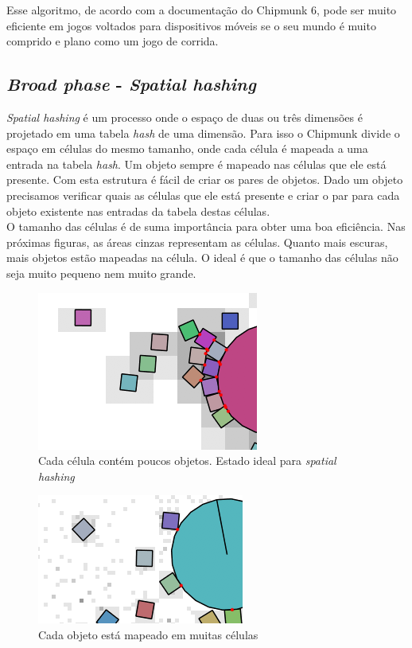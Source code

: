 Esse algoritmo, de acordo com a documentação do Chipmunk 6, pode ser muito eficiente em jogos voltados para dispositivos móveis se o seu mundo é muito comprido 
e plano como um jogo de corrida.

\subsection{\textit{Broad phase} - \textit{Spatial hashing}}

\textit{Spatial hashing} é um processo onde o espaço de duas ou três dimensões é projetado em uma tabela \textit{hash} de uma dimensão. Para isso o Chipmunk divide o espaço em 
células do mesmo tamanho, onde cada célula é mapeada a uma entrada na tabela \textit{hash}. Um objeto sempre é mapeado nas células que ele está presente. Com esta estrutura 
  é fácil de criar os pares de objetos. Dado um objeto precisamos verificar quais as células que ele está presente e criar o par para cada objeto existente nas 
entradas da tabela destas células.\\

O tamanho das células é de suma importância para obter uma boa eficiência. Nas próximas figuras, as áreas cinzas representam as células. Quanto mais escuras, mais objetos estão mapeadas na célula. O ideal é que o tamanho das células não seja muito pequeno nem muito grande.\\

\begin{figure}[!htbp]
  \centering
  \includegraphics[scale=1]{hash_just_right.png}
  \caption{Cada célula contém poucos objetos. Estado ideal para \textit{spatial hashing}}
\end{figure}

\begin{figure}[!htbp]
  \centering
  \includegraphics[scale=1]{hash_too_small.png}
  \caption{Cada objeto está mapeado em muitas células}
\end{figure}

